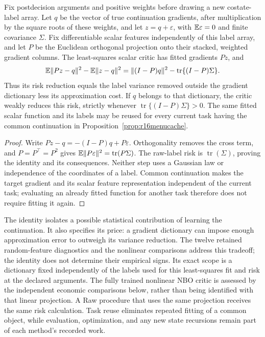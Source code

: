 \begin{proposition}
\label{prop:r16menuprojection}
Fix postdecision arguments and positive weights before drawing a new
costate-label array. Let $q$ be the vector of true continuation gradients,
after multiplication by the square roots of these weights, and let
$z=q+\varepsilon$, with $\mathbb E\varepsilon=0$ and finite covariance
$\Sigma$. Fix differentiable scalar features independently of this
label array, and let $P$ be the Euclidean orthogonal projection onto
their stacked, weighted gradient columns. The least-squares scalar
critic has fitted gradients $Pz$, and
\[
 \mathbb E\|Pz-q\|^2-\mathbb E\|z-q\|^2
   =\|(I-P)q\|^2-\operatorname{tr}\{(I-P)\Sigma\}.
\]
Thus its risk reduction equals the label variance removed outside the
gradient dictionary less its approximation cost. If $q$ belongs to that
dictionary, the critic weakly reduces this risk, strictly whenever
$\operatorname{tr}\{(I-P)\Sigma\}>0$. The same fitted scalar
function and its labels may be reused for every current task having
the common continuation in Proposition~\ref{prop:r16menucache}.
\end{proposition}

\begin{proof}
Write $Pz-q=-(I-P)q+P\varepsilon$. Orthogonality removes the
cross term, and $P=P^\top=P^2$ gives
$\mathbb E\|P\varepsilon\|^2=\operatorname{tr}(P\Sigma)$.
The raw-label risk is $\operatorname{tr}(\Sigma)$, proving the
identity and its consequences. Neither step uses a Gaussian law or
independence of the coordinates of a label. Common continuation makes
the target gradient and its scalar feature representation independent
of the current task; evaluating an already fitted function for another
task therefore does not require fitting it again.
\end{proof}

The identity isolates a possible statistical contribution of learning
the continuation. It also specifies its price: a gradient dictionary
can impose enough approximation error to outweigh its variance
reduction. The twelve retained random-feature diagnostics and the
nonlinear comparisons address this tradeoff; the identity does not
determine their empirical signs. Its exact scope is a dictionary fixed
independently of the labels used for this least-squares fit and risk
at the declared arguments. The fully trained nonlinear NBO critic is
assessed by the independent economic comparisons below, rather than
being identified with that linear projection. A Raw procedure that
uses the same projection receives the same risk calculation. Task
reuse eliminates repeated fitting of a common object, while evaluation,
optimization, and any new state recursions remain part of each method's
recorded work.

